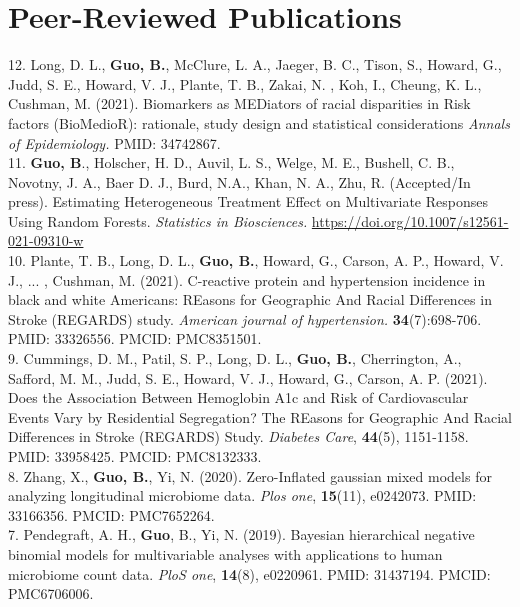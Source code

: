 \section{Peer-Reviewed Publications}

\vspace{-3ex}

12. Long, D. L., \textbf{Guo, B.}, McClure, L. A., Jaeger, B. C., Tison, S., Howard, G., Judd, S. E., Howard, V. J., Plante, T. B., Zakai, N. , Koh, I., Cheung, K. L., Cushman, M. (2021). Biomarkers as MEDiators of racial disparities in Risk factors (BioMedioR): rationale, study design and statistical considerations \textit{Annals of Epidemiology.} PMID: 34742867. \\

11. {\bf Guo, B}., Holscher, H. D., Auvil, L. S., Welge, M. E., Bushell, C. B., Novotny, J. A., Baer D. J., Burd, N.A., Khan, N. A., Zhu, R. (Accepted/In press). Estimating Heterogeneous Treatment Effect on Multivariate Responses Using Random Forests. {\it Statistics in Biosciences.} \url{https://doi.org/10.1007/s12561-021-09310-w}\\

10. Plante, T. B., Long, D. L., \textbf{Guo, B.}, Howard, G., Carson, A. P., Howard, V. J., ... , Cushman, M. (2021). C-reactive protein and hypertension incidence in black and white Americans: REasons for Geographic And Racial Differences in Stroke (REGARDS) study. \textit{American journal of hypertension.} {\bf 34}(7):698-706. PMID: 33326556. PMCID: PMC8351501. \\

9. Cummings, D. M., Patil, S. P., Long, D. L., {\bf Guo, B.}, Cherrington, A., Safford, M. M., Judd, S. E., Howard, V. J., Howard, G., Carson, A. P. (2021). Does the Association Between Hemoglobin A1c and Risk of Cardiovascular Events Vary by Residential Segregation? The REasons for Geographic And Racial Differences in Stroke (REGARDS) Study. {\it Diabetes Care}, {\bf 44}(5), 1151-1158. PMID: 33958425. PMCID: PMC8132333.\\

8. Zhang, X., {\bf Guo, B.}, Yi, N. (2020). Zero-Inflated gaussian mixed models for analyzing longitudinal microbiome data. {\it Plos one}, {\bf 15}(11), e0242073. PMID: 33166356. PMCID: PMC7652264.\\

7. Pendegraft, A. H., {\bf Guo}, B., Yi, N. (2019). Bayesian hierarchical negative binomial models for multivariable analyses with applications to human microbiome count data. {\it PloS one}, {\bf 14}(8), e0220961. PMID: 31437194. PMCID: PMC6706006.\\

